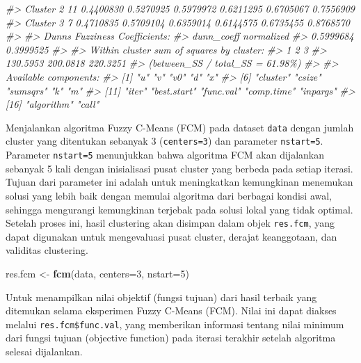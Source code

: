 \documentclass[
  oneside]{book}
\newenvironment{Shaded}{\begin{snugshade}}{\end{snugshade}}
\newcommand{\AttributeTok}[1]{\textcolor[rgb]{0.13,0.29,0.53}{#1}}
\newcommand{\CommentTok}[1]{\textcolor[rgb]{0.56,0.35,0.01}{\textit{#1}}}
\newcommand{\DecValTok}[1]{\textcolor[rgb]{0.00,0.00,0.81}{#1}}
\newcommand{\FunctionTok}[1]{\textcolor[rgb]{0.13,0.29,0.53}{\textbf{#1}}}
\newcommand{\NormalTok}[1]{#1}
\newcommand{\OtherTok}[1]{\textcolor[rgb]{0.56,0.35,0.01}{#1}}
\begin{document}
\begin{Shaded}
\begin{Highlighting}[]
\CommentTok{\#\textgreater{} Cluster 2   11 0.4400830 0.5270925 0.5979972 0.6211295 0.6705067 0.7556909}
\CommentTok{\#\textgreater{} Cluster 3    7 0.4710835 0.5709104 0.6359014 0.6144575 0.6735455 0.8768570}
\CommentTok{\#\textgreater{} }
\CommentTok{\#\textgreater{} Dunn\textquotesingle{}s Fuzziness Coefficients:}
\CommentTok{\#\textgreater{} dunn\_coeff normalized }
\CommentTok{\#\textgreater{}  0.5999684  0.3999525 }
\CommentTok{\#\textgreater{} }
\CommentTok{\#\textgreater{} Within cluster sum of squares by cluster:}
\CommentTok{\#\textgreater{}        1        2        3 }
\CommentTok{\#\textgreater{} 130.5953 200.0818 220.3251 }
\CommentTok{\#\textgreater{} (between\_SS / total\_SS =  61.98\%) }
\CommentTok{\#\textgreater{} }
\CommentTok{\#\textgreater{} Available components: }
\CommentTok{\#\textgreater{}  [1] "u"          "v"          "v0"         "d"          "x"         }
\CommentTok{\#\textgreater{}  [6] "cluster"    "csize"      "sumsqrs"    "k"          "m"         }
\CommentTok{\#\textgreater{} [11] "iter"       "best.start" "func.val"   "comp.time"  "inpargs"   }
\CommentTok{\#\textgreater{} [16] "algorithm"  "call"}
\end{Highlighting}
\end{Shaded}

Menjalankan algoritma Fuzzy C-Means (FCM) pada dataset \texttt{data} dengan jumlah cluster yang ditentukan sebanyak 3 (\texttt{centers=3}) dan parameter \texttt{nstart=5}. Parameter \texttt{nstart=5} menunjukkan bahwa algoritma FCM akan dijalankan sebanyak 5 kali dengan inisialisasi pusat cluster yang berbeda pada setiap iterasi. Tujuan dari parameter ini adalah untuk meningkatkan kemungkinan menemukan solusi yang lebih baik dengan memulai algoritma dari berbagai kondisi awal, sehingga mengurangi kemungkinan terjebak pada solusi lokal yang tidak optimal. Setelah proses ini, hasil clustering akan disimpan dalam objek \texttt{res.fcm}, yang dapat digunakan untuk mengevaluasi pusat cluster, derajat keanggotaan, dan validitas clustering.

\begin{Shaded}
\begin{Highlighting}[]
\NormalTok{res.fcm }\OtherTok{\textless{}{-}} \FunctionTok{fcm}\NormalTok{(data, }\AttributeTok{centers=}\DecValTok{3}\NormalTok{, }\AttributeTok{nstart=}\DecValTok{5}\NormalTok{)}
\end{Highlighting}
\end{Shaded}

Untuk menampilkan nilai objektif (fungsi tujuan) dari hasil terbaik yang ditemukan selama eksperimen Fuzzy C-Means (FCM). Nilai ini dapat diakses melalui \texttt{res.fcm\$func.val}, yang memberikan informasi tentang nilai minimum dari fungsi tujuan (objective function) pada iterasi terakhir setelah algoritma selesai dijalankan.
\end{document}
